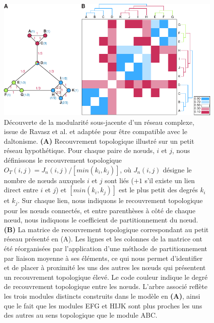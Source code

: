 \begin{figure}[h!]
    \centering
    \includegraphics{img/intro/3_coexpr/intro_3_coexpr_ravasz_topological_overlap.pdf}
    \caption[Découverte de la modularité sous-jacente d'un réseau complexe]{Découverte de la modularité sous-jacente d'un réseau complexe, issue de Ravasz et al. \cite{Ravasz2002} et adaptée pour être compatible avec le daltonisme. \textbf{(A)} Recouvrement topologique illustré sur un petit réseau hypothétique. Pour chaque paire de nœuds, $i$ et $j$, nous définissons le recouvrement topologique $O_T(i, j) = J_n(i, j)/[min (k_i,k_j)]$, où $J_n(i, j)$ désigne le nombre de nœuds auxquels $i$ et $j$ sont liés ($+1$ s'il existe un lien direct entre $i$ et $j$) et $[min (k_i,k_j)]$ est le plus petit des degrés $k_i$ et $k_j$. Sur chaque lien, nous indiquons le recouvrement topologique pour les nœuds connectés, et entre parenthèses à côté de chaque nœud, nous indiquons le coefficient de partitionnement du nœud. \textbf{(B)} La matrice de recouvrement topologique correspondant au petit réseau présenté en (A). Les lignes et les colonnes de la matrice ont été réorganisées par l'application d'une méthode de partitionnement par liaison moyenne \cite{Eisen1998Dec} à ses éléments, ce qui nous permet d'identifier et de placer à proximité les uns des autres les nœuds qui présentent un recouvrement topologique élevé. Le code couleur indique le degré de recouvrement topologique entre les nœuds. L'arbre associé reflète les trois modules distincts construits dans le modèle en \textbf{(A)}, ainsi que le fait que les modules EFG et HIJK sont plus proches les uns des autres au sens topologique que le module ABC.}
    \label{fig:topological_overlap_schema}
\end{figure}

